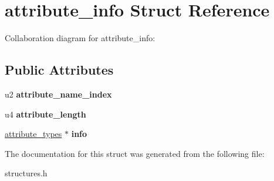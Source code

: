 \hypertarget{structattribute__info}{}\section{attribute\+\_\+info Struct Reference}
\label{structattribute__info}


Collaboration diagram for attribute\+\_\+info\+:
\subsection*{Public Attributes}
\begin{DoxyCompactItemize}
\item 
u2 {\bfseries attribute\+\_\+name\+\_\+index}\hypertarget{structattribute__info_a19df9d4b42eb55ca5dc1bed98df89378}{}\label{structattribute__info_a19df9d4b42eb55ca5dc1bed98df89378}

\item 
u4 {\bfseries attribute\+\_\+length}\hypertarget{structattribute__info_a1ed8f679458c4bb0ed3315721588f50d}{}\label{structattribute__info_a1ed8f679458c4bb0ed3315721588f50d}

\item 
\hyperlink{unionattribute__types}{attribute\+\_\+types} $\ast$ {\bfseries info}\hypertarget{structattribute__info_a78e740adccb41defb505248c47093958}{}\label{structattribute__info_a78e740adccb41defb505248c47093958}

\end{DoxyCompactItemize}


The documentation for this struct was generated from the following file\+:\begin{DoxyCompactItemize}
\item 
structures.\+h\end{DoxyCompactItemize}

